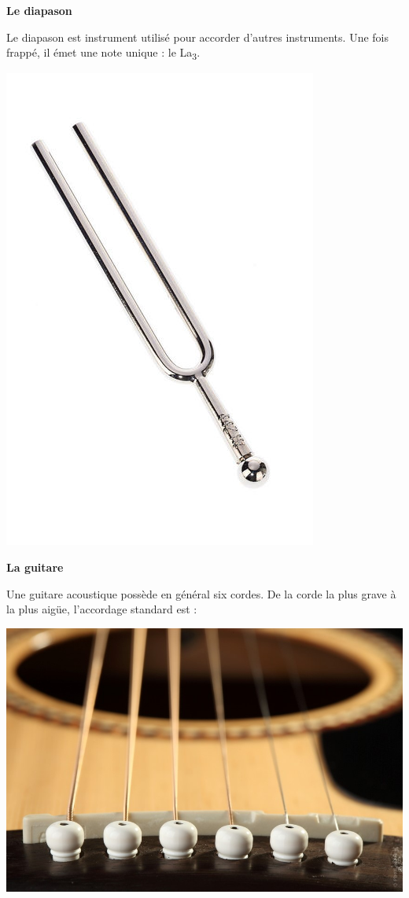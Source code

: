 \documentclass[12pt,a4paper]{article}
\begin{document}
\begin{multicols}{2}
\begin{doc}
\label{doc:diapason}
\textbf{Le diapason}

Le diapason est instrument utilisé pour accorder d'autres instruments.
Une fois frappé, il émet une note unique : le La\textsubscript{3}.
\begin{center}
\includegraphics[scale=1.07]{images/diapason.png}
\end{center}
\end{doc}

\begin{doc}
\textbf{La guitare}

Une guitare acoustique possède en général six cordes.
De la corde la plus grave à la plus aigüe, l'accordage standard est :

\begin{center}
\includegraphics[scale=1]{images/cordes_guitare.jpg}


\end{center}
\end{doc}
\end{multicols}
\end{document}
